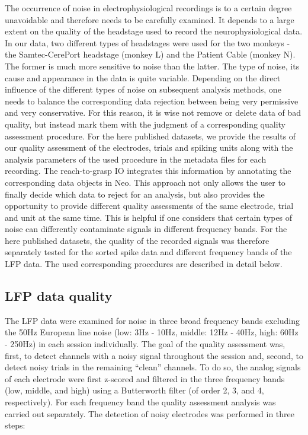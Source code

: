 {The occurrence of noise in electrophysiological recordings is to a certain degree unavoidable and therefore needs to be carefully examined. It depends to a large extent on the quality of the headstage used to record the neurophysiological data. In our data, two different types of headstages were used for the two monkeys - the Samtec-CerePort headstage (monkey L) and the Patient Cable (monkey N). The former is much more sensitive to noise than the latter. The type of noise, its cause and appearance in the data is quite variable. Depending on the direct influence of the different types of noise on subsequent analysis methods, one needs to balance the corresponding data rejection between being very permissive and very conservative. For this reason, it is wise not remove or delete data of bad quality, but instead mark them with the judgment of a corresponding quality assessment procedure. For the here published datasets, we provide the results of our quality assessment of the electrodes, trials and spiking units along with the analysis parameters of the used procedure in the  metadata files for each recording. The reach-to-grasp IO integrates this information by annotating the corresponding data objects in Neo. This approach not only allows the user to finally decide which data to reject for an analysis, but also provides the opportunity to provide different quality assessments of the same electrode, trial and unit at the same time. This is helpful if one considers that certain types of noise can differently contaminate signals in different frequency bands. For the here published datasets, the quality of the recorded signals was therefore separately tested for the sorted spike data and different frequency bands of the LFP data. The used corresponding procedures are described in detail below. 

\subsection{LFP data quality}

The LFP data were examined for noise in three broad frequency bands excluding the 50Hz European line noise (low: 3Hz - 10Hz, middle: 12Hz - 40Hz, high: 60Hz - 250Hz) in each session individually. The goal of the quality assessment was, first, to detect channels with a noisy signal throughout the session and, second, to detect noisy trials in the remaining “clean” channels. To do so, the analog signals of each electrode were first z-scored and filtered in the three frequency bands (low, middle, and high) using a Butterworth filter (of order 2, 3, and 4, respectively). For each frequency band the quality assessment analysis was carried out separately. The detection of noisy electrodes was performed in three steps: 

}
